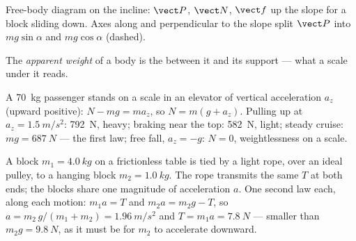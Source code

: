 \begin{omfigure}

{\small Free-body diagram on the incline:  $\vect P$,  $\vect N$,
 $\vect f$ up the slope for a block sliding down. Axes along and perpendicular
to the slope split $\vect P$ into $mg\sin\alpha$ and $mg\cos\alpha$ (dashed).}
\end{omfigure}

\begin{definition}\label{def:g12:newtons-laws:apparent}
The \emph{apparent weight} of a body is the 
between it and its support --- what a scale under it reads.
\end{definition}

\begin{example}\label{ex:g12:newtons-laws:elevator}
A \qty{70}{kg} passenger stands on a scale in an elevator of vertical acceleration
$a_z$ (upward positive): $N - mg = ma_z$, so $N = m(g + a_z)$. Pulling up at
$a_z = \qty{1.5}{m/s^2}$: \qty{792}{N}, heavy; braking near the top: \qty{582}{N},
light; steady cruise: $mg = \qty{687}{N}$ --- the first law; free fall, $a_z = -g$:
$N = 0$, weightlessness on a scale.
\end{example}

\begin{example}\label{ex:g12:newtons-laws:pulley}
A block $m_1 = \qty{4.0}{kg}$ on a frictionless table is tied by a light rope, over
an ideal pulley, to a hanging block $m_2 = \qty{1.0}{kg}$. The rope transmits the
same  $T$ at both ends; the blocks share one magnitude of acceleration $a$.
One second law each, along each motion: $m_1 a = T$ and $m_2 a = m_2 g - T$, so
$a = m_2\,g/(m_1 + m_2) = \qty{1.96}{m/s^2}$ and $T = m_1 a = \qty{7.8}{N}$ ---
smaller than $m_2 g = \qty{9.8}{N}$, as it must be for $m_2$ to accelerate downward.
\end{example}

